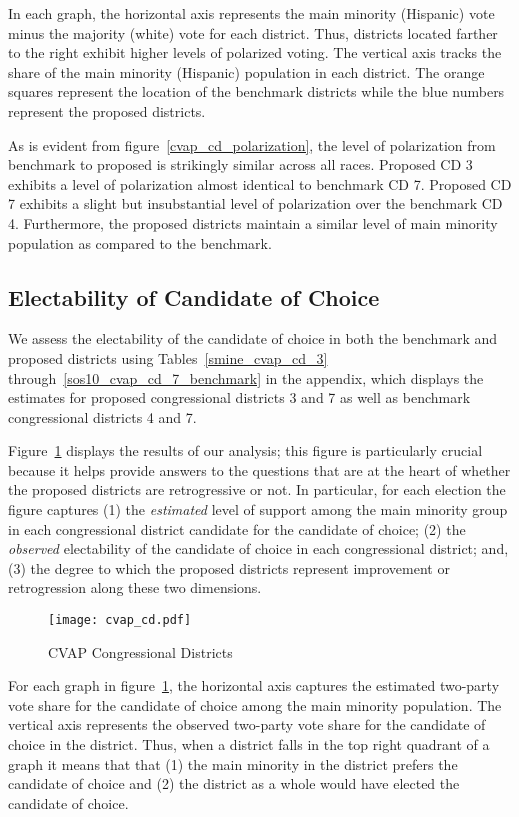 \documentclass[12pt]{scrartcl}
\begin{document}
In each graph, the horizontal axis represents the main minority (Hispanic) vote minus the majority (white) vote for each district. Thus, districts located farther to the right exhibit higher levels of polarized voting. The vertical axis tracks the share of the main minority (Hispanic) population in each district. The orange squares represent the location of the benchmark districts while the blue numbers represent the proposed districts.

As is evident from figure~\ref{cvap_cd_polarization}, the level of polarization from benchmark to proposed is strikingly similar across all races. Proposed CD 3 exhibits a level of polarization almost identical to benchmark CD 7. Proposed CD 7 exhibits a slight but insubstantial level of polarization over the benchmark CD 4. Furthermore, the proposed districts maintain a similar level of main minority population as compared to the benchmark.

\subsection{Electability of Candidate of Choice}
We assess the electability of the candidate of choice in both the benchmark and proposed districts using Tables~\ref{smine_cvap_cd_3} through~\ref{sos10_cvap_cd_7_benchmark} in the appendix, which displays the estimates for proposed congressional districts 3 and 7 as well as benchmark congressional districts 4 and 7.

Figure~\ref{cvap_cd} displays the results of our analysis; this figure is particularly crucial because it helps provide answers to the questions that are at the heart of whether the proposed districts are retrogressive or not. In particular, for each election the figure captures (1) the {\it estimated} level of support  among the main minority group in each congressional district candidate for the candidate of choice; (2) the {\it observed} electability of the candidate of choice in each congressional district; and, (3) the degree to which the proposed districts represent improvement or retrogression along these two dimensions.

\begin{figure}[!h]
\begin{centering}
\texttt{[image: cvap\_cd.pdf]}
\caption{CVAP Congressional Districts}
\end{centering}
\label{cvap_cd}
\end{figure}

For each graph in figure~\ref{cvap_cd}, the horizontal axis captures the estimated two-party vote share for the candidate of choice among the main minority population. The vertical axis represents the observed two-party vote share for the candidate of choice in the district. Thus, when a district falls in the top right quadrant of a graph it means that that (1) the main minority in the district prefers the candidate of choice and (2) the district as a whole would have elected the candidate of choice. 
\end{document}
